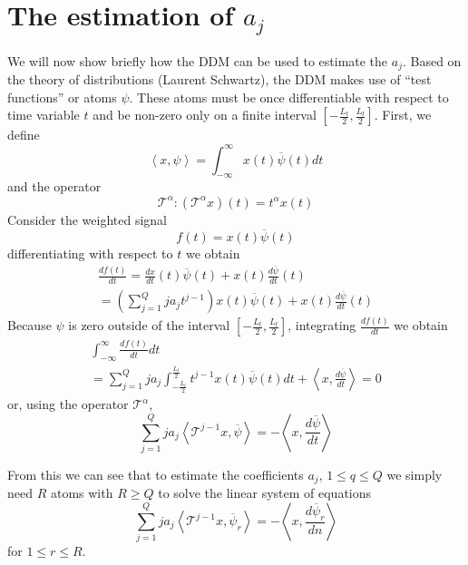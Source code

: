 \documentclass[twoside,a4paper]{article}
\begin{document}
\section{The estimation of $a_j$}
We will now show briefly how the DDM can be used to estimate the $a_j$. Based on
the theory of distributions (Laurent Schwartz), the DDM
makes use of ``test
functions'' or atoms $\psi$. These atoms must be once differentiable with respect to
time variable $t$ and be non-zero only on a finite interval $[-\frac{L_{t}}{2},\frac{L_{t}}{2}]$. First, we define
%
\begin{equation}
    \label{eq:ddm:inner:prod:def}
    \left\langle x , \psi \right\rangle = 
    \int_{-\infty}^{\infty}x(t)\overline{\psi}(t)dt
\end{equation}
%
and the operator 
%
\[
\mathcal{T}^{\alpha} : (\mathcal{T}^{\alpha}x)(t) = t^{\alpha}x(t)
\]
%
Consider the weighted signal
%
\[
    f(t) = x(t) \overline{\psi}(t)
\]
%
differentiating with respect to $t$ we obtain
%
\begin{multline}
    \label{eq:ddm:weighted:sig:derivative}
    \frac{df(t)}{dt} = 
    \frac{dx}{dt}(t)\overline{\psi}(t)
    + x(t)\frac{d\overline{\psi}}{dt}(t) \\
    = \left( \sum_{j=1}^{Q} j a_j t^{j-1} \right) x(t)\overline{\psi}(t)
    + x(t)\frac{d\overline{\psi}}{dt}(t)
\end{multline}
%
Because $\psi$ is zero outside of the interval $[-\frac{L_{t}}{2},\frac{L_{t}}{2}]$, integrating
$\frac{df(t)}{dt}$ we obtain
%
\begin{multline*}
    \int_{-\infty}^{\infty}\frac{df(t)}{dt}dt \\
    = \sum_{j=1}^{Q} j a_j \int_{-\frac{L_{t}}{2}}^{\frac{L_{t}}{2}} t^{j-1} x(t) \overline{\psi}(t) dt
    + \left\langle x, \frac{d\overline{\psi}}{dt} \right\rangle = 0
\end{multline*}
%
or, using the operator $\mathcal{T}^{\alpha}$,
%
\[ 
    \sum_{j=1}^{Q} j a_j 
    \left\langle \mathcal{T}^{j-1} x , \overline{\psi} \right\rangle
    = -\left\langle x, \frac{d\overline{\psi}}{dt} \right\rangle
\]
%

From this we can see that to estimate the coefficients $a_j$, $ 1 \leq q \leq Q
$ we simply need $R$ atoms with $R \geq Q$ to solve the linear system of
equations
\begin{equation}
    \label{eq:ddmsyseq}
    \sum_{j=1}^{Q} j a_j 
    \left\langle \mathcal{T}^{j-1} x , \overline{\psi}_{r} \right\rangle
    = -\left\langle x, \frac{d\overline{\psi}_{r}}{dn} \right\rangle
\end{equation}
for $1 \leq r \leq R$.
\end{document}
